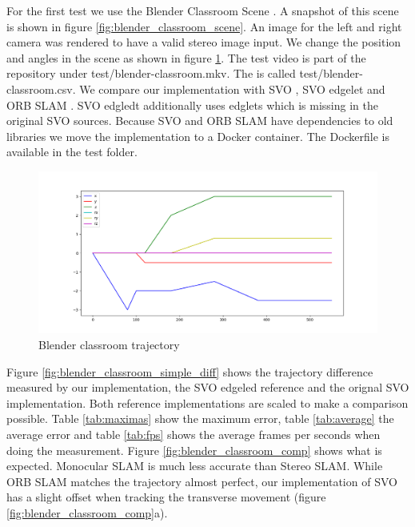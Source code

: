 \documentclass[11pt,a4paper,titlepage,oneside]{report}
\begin{document}
For the first test we use the Blender Classroom Scene \cite{blender}. A snapshot of this scene is shown in figure \ref{fig:blender_classroom_scene}. An image for the left and right camera was rendered to have a valid stereo image input. We change the position and angles in the scene as shown in figure \ref{fig:blender_classroom_simple_traj}. The test video is part of the repository under test/blender-classroom.mkv. The is called test/blender-classroom.csv. We compare our implementation with SVO \cite{svo}, SVO edgelet \cite{svo_edglet} and ORB SLAM \cite{orbslam}. SVO edgledt additionally uses edglets which is missing in the original SVO sources. Because SVO and ORB SLAM have dependencies to old libraries we move the implementation to a Docker container. The Dockerfile is available in the test folder.

\begin{figure}[H]
  \centering
  \includegraphics[width=1.0\textwidth]{img/blender_classroom_simple_traj.png}
  \caption{Blender classroom trajectory}\label{fig:blender_classroom_simple_traj}
\end{figure}

Figure \ref{fig:blender_classroom_simple_diff} shows the trajectory difference measured by our implementation, the SVO edgeled reference and the orignal SVO implementation. Both reference implementations are scaled to make a comparison possible. Table \ref{tab:maximas} show the maximum error, table \ref{tab:average} the average error and table \ref{tab:fps} shows the average frames per seconds when doing the measurement. Figure \ref{fig:blender_classroom_comp} shows what is expected. Monocular SLAM is much less accurate than Stereo SLAM. While ORB SLAM matches the trajectory almost perfect, our implementation of SVO has a slight offset when tracking the transverse movement (figure \ref{fig:blender_classroom_comp}a).
\end{document}
